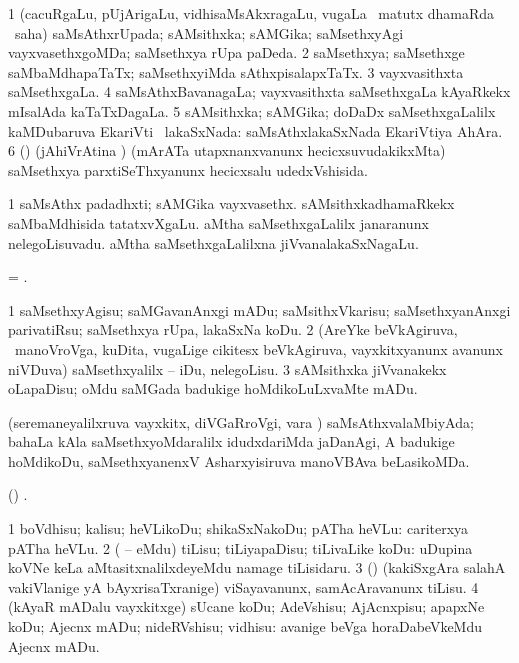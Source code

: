 \bentry
{}
\gl{\gu}
\bmng
\bnum
\num{1} (cacuRgaLu, pUjArigaLu, vidhisaMsAkxragaLu, \mo vugaLa \vi\ matutx dhamaRda \vi\ saha) saMsAthxrUpada; sAMsithxka; sAMGika; saMsethxyAgi vayxvasethxgoMDa; saMsethxya rUpa paDeda. 
\num{2} saMsethxya; saMsethxge saMbaMdhapaTaTx; saMsethxyiMda sAthxpisalapxTaTx. 
\num{3} vayxvasithxta saMsethxgaLa. 
\num{4} saMsAthxBavanagaLa; vayxvasithxta saMsethxgaLa kAyaRkekx mIsalAda kaTaTxDagaLa. 
\num{5} sAMsithxka; sAMGika; doDaDx saMsethxgaLalilx kaMDubaruva EkariVti \mo\ lakaSxNada:  saMsAthxlakaSxNada EkariVtiya AhAra. 
\num{6} (\ame) (jAhiVrAtina \vi) (mArATa utapxnanxvanunx hecicxsuvudakikxMta) saMsethxya parxtiSeThxyanunx hecicxsalu udedxVshisida. 
\enum
\emng
\eentry

\bentry
{}
\gl{\nA}
\bmng
\bnum
\num{1} saMsAthx padadhxti; sAMGika vayxvasethx. 
\banum
{} sAMsithxkadhamaRkekx saMbaMdhisida tatatxvXgaLu. 
 aMtha saMsethxgaLalilx janaranunx nelegoLisuvadu. 
 aMtha saMsethxgaLalilxna jiVvanalakaSxNagaLu. 
\eanum
\numie
\enum
\emng
\eentry

\bentry
{}
\gl{\sakirx}
\bmng
= . 
\emng
\eentry

\bentry
{}
\gl{\sakirx}
\bmng
\bnum
\num{1} saMsethxyAgisu; saMGavanAnxgi mADu; saMsithxVkarisu; saMsethxyanAnxgi parivatiRsu; saMsethxya rUpa, lakaSxNa koDu. 
\num{2} (AreYke beVkAgiruva, \kanmu\ manoVroVga, kuDita, \mo vugaLige cikitesx beVkAgiruva, vayxkitxyanunx avanunx niVDuva) saMsethxyalilx -- iDu, nelegoLisu. 
\num{3} sAMsithxka jiVvanakekx oLapaDisu; oMdu saMGada badukige hoMdikoLuLxvaMte mADu. 
\enum
\emng
\eentry

\bentry
{}
\gl{\gu}
\bmng
(seremaneyalilxruva vayxkitx, diVGaRroVgi, \mo vara \vi) saMsAthxvalaMbiyAda; bahaLa kAla saMsethxyoMdaralilx idudxdariMda jaDanAgi, A badukige hoMdikoDu, saMsethxyanenxV Asharxyisiruva manoVBAva beLasikoMDa. 
\emng
\eentry

\bentry
{}
\gl{\saMkiSx}
\bmng
(\birx) . 
\emng
\eentry

\bentry
{}
\gl{\sakirx}
\bmng
\bnum
\num{1} boVdhisu; kalisu; heVLikoDu; shikaSxNakoDu; pATha heVLu:  cariterxya pATha heVLu. 
\num{2} ( -- eMdu) tiLisu; tiLiyapaDisu; tiLivaLike koDu:  uDupina koVNe keLa aMtasitxnalilxdeyeMdu namage tiLisidaru. 
\num{3} (\birx) (kakiSxgAra salahA vakiVlanige yA bAyxrisaTxranige) viSayavanunx, samAcAravanunx tiLisu. 
\num{4} (kAyaR mADalu vayxkitxge) sUcane koDu; AdeVshisu; AjAcnxpisu; apapxNe koDu; Ajecnx mADu; nideRVshisu; vidhisu:  avanige beVga horaDabeVkeMdu Ajecnx mADu. 
\enum
\emng
\eentry

